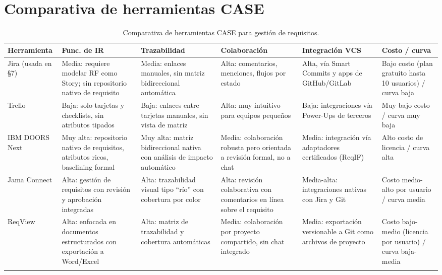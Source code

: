 \documentclass[11pt,a4paper]{article}
\begin{document}
\section{Comparativa de herramientas CASE}

\begin{longtable}{p{2.1cm}p{2.1cm}p{2.1cm}p{2.1cm}p{2.1cm}p{2.2cm}}
\toprule
\textbf{Herramienta} & \textbf{Func. de IR} & \textbf{Trazabilidad} & \textbf{Colaboración} & \textbf{Integración VCS} & \textbf{Costo / curva} \\
\midrule
\endhead
Jira (usada en \S7) & Media: requiere modelar RF como Story; sin repositorio nativo de requisito & Media: enlaces manuales, sin matriz bidireccional automática & Alta: comentarios, menciones, flujos por estado & Alta, vía Smart Commits y apps de GitHub/GitLab & Bajo costo (plan gratuito hasta 10 usuarios) / curva baja \\
Trello & Baja: solo tarjetas y checklists, sin atributos tipados & Baja: enlaces entre tarjetas manuales, sin vista de matriz & Alta: muy intuitivo para equipos pequeños & Baja: integraciones vía Power-Ups de terceros & Muy bajo costo / curva muy baja \\
IBM DOORS Next & Muy alta: repositorio nativo de requisitos, atributos ricos, baselining formal & Muy alta: matriz bidireccional nativa con análisis de impacto automático & Media: colaboración robusta pero orientada a revisión formal, no a chat & Media: integración vía adaptadores certificados (ReqIF) & Alto costo de licencia / curva alta \\
Jama Connect & Alta: gestión de requisitos con revisión y aprobación integradas & Alta: trazabilidad visual tipo ``río'' con cobertura por color & Alta: revisión colaborativa con comentarios en línea sobre el requisito & Media-alta: integraciones nativas con Jira y Git & Costo medio-alto por usuario / curva media \\
ReqView & Alta: enfocada en documentos estructurados con exportación a Word/Excel & Alta: matriz de trazabilidad y cobertura automáticas & Media: colaboración por proyecto compartido, sin chat integrado & Media: exportación versionable a Git como archivos de proyecto & Costo bajo-medio (licencia por usuario) / curva baja-media \\
\bottomrule
\caption{Comparativa de herramientas CASE para gestión de requisitos.}
\end{longtable}
\end{document}
